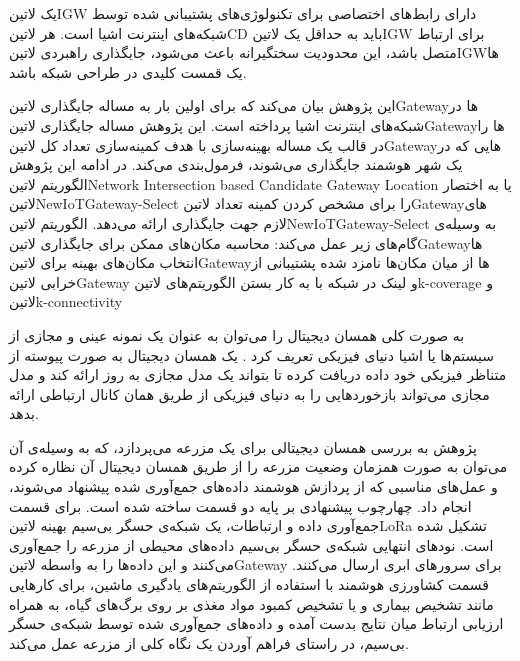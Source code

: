 یک ‌لاتین{IGW} دارای رابط‌های اختصاصی برای تکنولوژی‌های پشتیبانی شده توسط شبکه‌های اینترنت اشیا است.
هر ‌لاتین{CD} باید به حداقل یک ‌لاتین{IGW} برای ارتباط متصل باشد، این محدودیت سختگیرانه باعث می‌شود، جایگذاری راهبردی ‌لاتین{IGW}ها یک قمست کلیدی
در طراحی شبکه باشد.

این پژوهش بیان می‌کند که برای اولین بار به مساله جایگذاری ‌لاتین{Gateway}ها در شبکه‌های اینترنت اشیا پرداخته است.
این پژوهش مساله جایگذاری ‌لاتین{Gateway}ها را در قالب یک مساله بهینه‌سازی با هدف کمینه‌سازی تعداد کل ‌لاتین{Gateway}هایی که در یک شهر هوشمند
جایگذاری می‌شوند، فرمول‌بندی می‌کند.
در ادامه این پژوهش الگوریتم ‌لاتین{Network Intersection based Candidate Gateway Location}
یا به اختصار ‌لاتین{NewIoTGateway-Select} را برای مشخص کردن کمینه تعداد ‌لاتین{Gateway}های لازم جهت جایگذاری ارائه می‌دهد.
الگوریتم ‌لاتین{NewIoTGateway-Select} به وسیله‌ی گام‌های زیر عمل می‌کند:
 محاسبه مکان‌های ممکن برای جایگذاری ‌لاتین{Gateway}ها
 انتخاب مکان‌های بهینه برای ‌لاتین{Gateway}ها از میان مکان‌ها نامزد شده
 پشتیبانی از خرابی ‌لاتین{Gateway} و لینک در شبکه با به کار بستن الگوریتم‌های ‌لاتین{k-coverage} و ‌لاتین{k-connectivity}


به صورت کلی همسان دیجیتال را می‌توان به عنوان یک نمونه عینی و مجازی از سیستم‌ها یا اشیا دنیای فیزیکی تعریف کرد .
یک همسان دیجیتال به صورت پیوسته از متناظر فیزیکی خود داده دریافت کرده تا بتواند یک مدل مجازی به روز ارائه کند و مدل مجازی
می‌تواند بازخوردهایی را به دنیای فیزیکی از طریق همان کانال ارتباطی ارائه بدهد.


پژوهش  به بررسی همسان دیجیتالی برای یک مزرعه می‌پردازد، که به وسیله‌ی آن می‌توان به صورت همزمان وضعیت مزرعه را از طریق
همسان دیجیتال آن نظاره کرده و عمل‌های مناسبی که از پردازش هوشمند داده‌های جمع‌آوری شده پیشنهاد می‌شوند، انجام داد.
چهارچوب پیشنهادی بر پایه دو قسمت ساخته شده است. برای قسمت جمع‌آوری داده و ارتباطات، یک شبکه‌ی حسگر بی‌سیم بهینه ‌لاتین{LoRa} تشکیل شده است.
نودهای انتهایی شبکه‌ی حسگر بی‌سیم داده‌های محیطی از مزرعه را جمع‌آوری می‌کنند و این داده‌ها را به واسطه ‌لاتین{Gateway} برای سرورهای ابری ارسال می‌کنند.
قسمت کشاورزی هوشمند با استفاده از الگوریتم‌های یادگیری ماشین، برای کارهایی مانند تشخیص بیماری و یا تشخیص کمبود مواد مغذی بر روی برگ‌های گیاه،
به همراه ارزیابی ارتباط میان نتایج بدست آمده و داده‌های جمع‌آوری شده توسط شبکه‌ی حسگر بی‌سیم، در راستای فراهم آوردن یک نگاه کلی از مزرعه عمل می‌کند.

